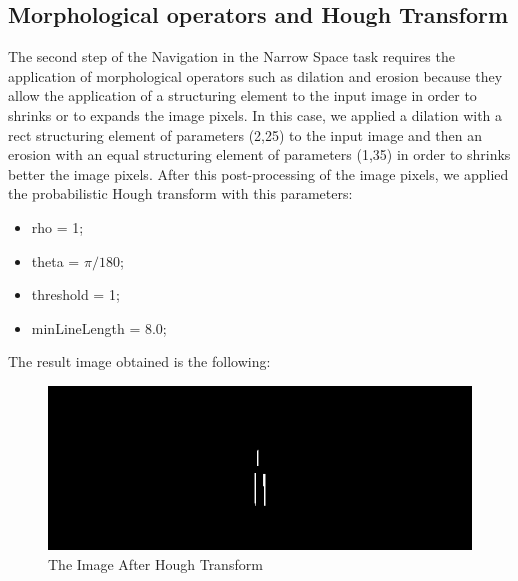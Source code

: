 \subsection{Morphological operators and Hough Transform}
The second step of the Navigation in the Narrow Space task requires the application of morphological operators such as dilation and erosion because they allow the application of a structuring element to the input image in order to shrinks or to expands the image pixels. In this case, we applied a dilation with a rect structuring element of parameters (2,25) to the input image and then an erosion with an equal structuring element of parameters (1,35) in order to shrinks better the image pixels. 
After this post-processing of the image pixels, we applied the probabilistic Hough transform with this parameters:
\begin{itemize}
    \item rho = 1;
    \item theta = \(\pi/180\); 
    \item threshold = 1;
    \item minLineLength = 8.0;
\end{itemize}
The result image obtained is the following:
\begin{center}
        \begin{figure}[H]
            \begin{minipage}{1.0\textwidth}
                \centering
                    \includegraphics[scale=0.70]{images/narrowSpace/houghImage.png}
                \caption{The Image After Hough Transform}
            \end{minipage}
        \end{figure}            
\end{center}
